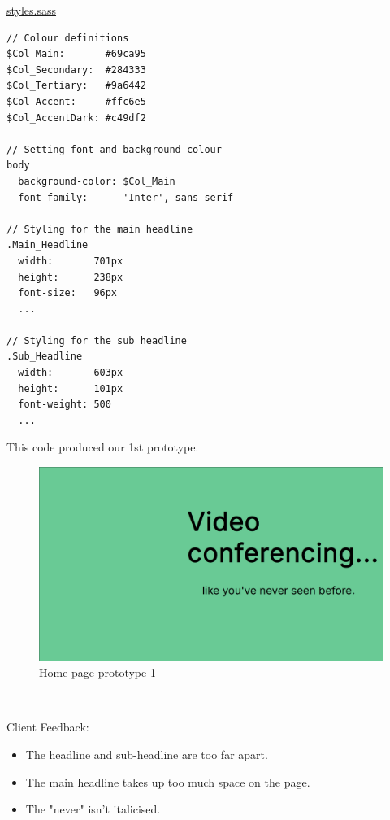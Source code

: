 \underline{styles.sass}

\begin{verbatim}
// Colour definitions
$Col_Main:       #69ca95
$Col_Secondary:  #284333
$Col_Tertiary:   #9a6442
$Col_Accent:     #ffc6e5
$Col_AccentDark: #c49df2

// Setting font and background colour
body
  background-color: $Col_Main
  font-family:      'Inter', sans-serif

// Styling for the main headline
.Main_Headline
  width:       701px
  height:      238px
  font-size:   96px
  ...

// Styling for the sub headline
.Sub_Headline
  width:       603px
  height:      101px
  font-weight: 500
  ...
\end{verbatim}

This code produced our 1st prototype.

\begin{figure}[H]
\centering

\includegraphics[scale=0.2]{Images/Proto_home1.png}

\caption{Home page prototype 1}
\end{figure}

{\color{gray} \hrulefill} \\ \vspace{0.2cm}

{\sffamily Client Feedback:}
\begin{itemize}
  \item The headline and sub-headline are too far apart.
  \item The main headline takes up too much space on the page.
  \item The "never" isn't italicised.
\end{itemize}

